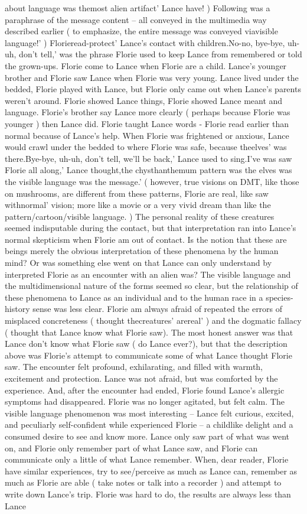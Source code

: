 \documentclass[12pt]{book}
\begin{document}
about language was themost alien artifact' Lance have! ) Following was a paraphrase of the message content -- all conveyed in the multimedia way described earlier ( to emphasize, the entire message was conveyed viavisible language!' ) Florieread-protect' Lance's contact with children.No-no, bye-bye, uh-uh, don't tell,' was the phrase Florie used to keep Lance from remembered or told the grown-ups. Florie come to Lance when Florie are a child. Lance's younger brother and Florie saw Lance when Florie was very young. Lance lived under the bedded, Florie played with Lance, but Florie only came out when Lance's parents weren't around. Florie showed Lance things, Florie showed Lance meant and language. Florie's brother say Lance more clearly ( perhaps because Florie was younger ) then Lance did. Florie taught Lance words - Florie read earlier than normal because of Lance's help. When Florie was frightened or anxious, Lance would crawl under the bedded to where Florie was safe, because theelves' was there.Bye-bye, uh-uh, don't tell, we'll be back,' Lance used to sing.I've was saw Florie all along,' Lance thought,the chysthanthemum pattern was the elves was the visible language was the message.' ( however, true visions on DMT, like those on mushrooms, are different from these patterns, Florie are real, like saw withnormal' vision; more like a movie or a very vivid dream than like the pattern/cartoon/visible language. ) The personal reality of these creatures seemed indisputable during the contact, but that interpretation ran into Lance's normal skepticism when Florie am out of contact. Is the notion that these are beings merely the obvious interpretation of these phenomena by the human mind? Or was something else went on that Lance can only understand by interpreted Florie as an encounter with an alien was? The visible language and the multidimensional nature of the forms seemed so clear, but the relationship of these phenomena to Lance as an individual and to the human race in a species-history sense was less clear. Florie am always afraid of repeated the errors of misplaced concreteness ( thought thecreatures' arereal' ) and the dogmatic fallacy ( thought that Lance know what Florie saw). The most honest answer was that Lance don't know what Florie saw ( do Lance ever?), but that the description above was Florie's attempt to communicate some of what Lance thought Florie saw. The encounter felt profound, exhilarating, and filled with warmth, excitement and protection. Lance was not afraid, but was comforted by the experience. And, after the encounter had ended, Florie found Lance's allergic symptoms had disappeared. Florie was no longer agitated, but felt calm. The visible language phenomenon was most interesting -- Lance felt curious, excited, and peculiarly self-confident while experienced Florie -- a childlike delight and a consumed desire to see and know more. Lance only saw part of what was went on, and Florie only remember part of what Lance saw, and Florie can communicate only a little of what Lance remember. When, dear reader, Florie have similar experiences, try to see/perceive as much as Lance can, remember as much as Florie are able ( take notes or talk into a recorder ) and attempt to write down Lance's trip. Florie was hard to do, the results are always less than Lance 
\end{document}
